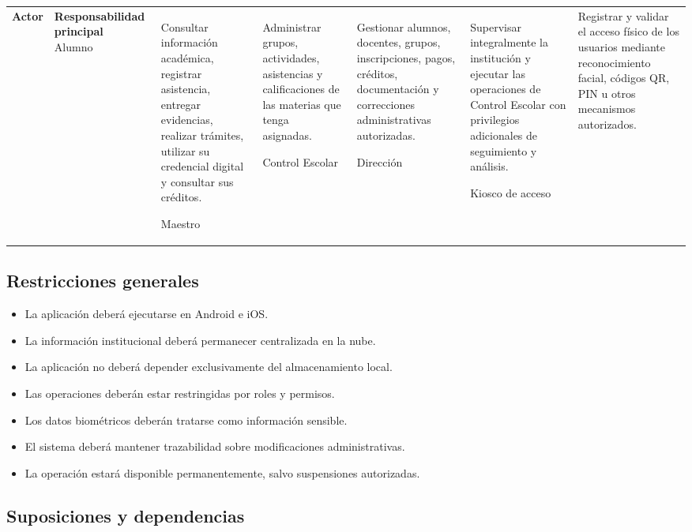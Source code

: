 \documentclass[12pt,a4paper]{article}
\begin{document}
\begin{longtable}{p{3.5cm}p{10.5cm}}
\toprule
\textbf{Actor} & \textbf{Responsabilidad principal}\
\midrule
Alumno &
Consultar información académica, registrar asistencia, entregar evidencias,
realizar trámites, utilizar su credencial digital y consultar sus créditos.\

Maestro &
Administrar grupos, actividades, asistencias y calificaciones de las materias
que tenga asignadas.\

Control Escolar &
Gestionar alumnos, docentes, grupos, inscripciones, pagos, créditos,
documentación y correcciones administrativas autorizadas.\

Dirección &
Supervisar integralmente la institución y ejecutar las operaciones de Control
Escolar con privilegios adicionales de seguimiento y análisis.\

Kiosco de acceso &
Registrar y validar el acceso físico de los usuarios mediante reconocimiento
facial, códigos QR, PIN u otros mecanismos autorizados.\
\bottomrule
\end{longtable}

\subsection{Restricciones generales}

\begin{itemize}[leftmargin=*]
\item La aplicación deberá ejecutarse en Android e iOS.
\item La información institucional deberá permanecer centralizada en la nube.
\item La aplicación no deberá depender exclusivamente del almacenamiento local.
\item Las operaciones deberán estar restringidas por roles y permisos.
\item Los datos biométricos deberán tratarse como información sensible.
\item El sistema deberá mantener trazabilidad sobre modificaciones administrativas.
\item La operación estará disponible permanentemente, salvo suspensiones autorizadas.
\end{itemize}

\subsection{Suposiciones y dependencias}
\end{document}

